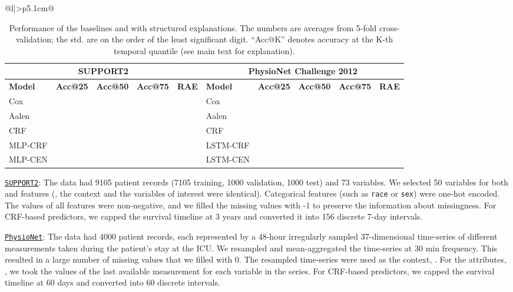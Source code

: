 \documentclass[twoside,11pt]{article}
\begin{document}
\begin{table}[t!]
\begin{tabular}[t]{@{}l|>{\raggedleft\arraybackslash}p{5.1cm}@{}}
\begin{table*}[t!]
    \centering
    \caption{\small Performance of the baselines and {\CENs} with structured explanations.
    The numbers are averages from 5-fold cross-validation; the std. are on the order of the least significant digit.
    ``Acc@K'' denotes accuracy at the K-th temporal quantile (see main text for explanation).}
    \vspace{-1ex}
    \fontsize{8}{10}\selectfont
    \def\arraystretch{1.0}
    \begin{tabular}[t]{@{}lrrrr|lrrrr@{}}
        \toprule
        \multicolumn{5}{c|}{\textbf{SUPPORT2}} &
        \multicolumn{5}{c}{\textbf{PhysioNet Challenge 2012}} \\
        \midrule
        \textbf{Model} &
        \textbf{Acc@25} & \textbf{Acc@50} & \textbf{Acc@75} & \textbf{RAE} &
        \textbf{Model} &
        \textbf{Acc@25} & \textbf{Acc@50} & \textbf{Acc@75} & \textbf{RAE} \\
        \midrule
        Cox         &     &     &     &     &
        Cox         &     &     &     &     \\
        Aalen       &     &     &     &     &
        Aalen       &     &     &     &     \\
        CRF         &     &     &     &     &
        CRF         &     &     &     &     \\
        MLP-CRF     &     &     &     &     &
        LSTM-CRF    &     &     &     &     \\
        \midrule
        MLP-CEN     &     &     &     &     &
        LSTM-CEN    &     &     &     &     \\
        \bottomrule
    \end{tabular}
    \label{tab:performance-survival}
    \vspace{-3ex}
\end{table*}
 
\underline{\texttt{SUPPORT2}}:
The data had 9105 patient records (7105 training, 1000 validation, 1000 test) and 73 variables.
We selected 50 variables for both  and  features (\ie, the context and the variables of interest were identical).
Categorical features (such as \texttt{race} or \texttt{sex}) were one-hot encoded.
The values of all features were non-negative, and we filled the missing values with -1 to preserve the information about missingness.
For CRF-based predictors, we capped the survival timeline at 3 years and converted it into 156 discrete 7-day intervals.

\underline{\texttt{PhysioNet}}:
The data had 4000 patient records, each represented by a 48-hour irregularly sampled 37-dimensional time-series of different measurements taken during the patient's stay at the ICU.
We resampled and mean-aggregated the time-series at 30 min frequency.
This resulted in a large number of missing values that we filled with 0.
The resampled time-series were used as the context, .
For the attributes, , we took the values of the last available measurement for each variable in the series.
For CRF-based predictors, we capped the survival timeline at 60 days and converted into 60 discrete intervals.


\end{tabular}
\end{table}
\end{document}
